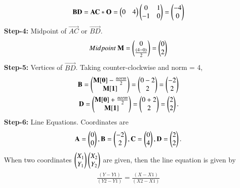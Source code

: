 \documentclass[journal,12pt,twocolumn]{IEEEtran}
\begin{document}
\begin{align}
\begin{split}
\mathbf{BD} =  \mathbf{AC * O} =  \begin{pmatrix}0&4\end{pmatrix}  \begin{pmatrix}0&1\\-1&0\end{pmatrix} = \begin{pmatrix}-4\\0\end{pmatrix}
\end{split}
\end{align}
\textbf{Step-4:} Midpoint of $\vec{AC}$ or $\vec{BD}$.
\\
\begin{align}
\begin{split}
 Midpoint\ \mathbf{M} = \begin{pmatrix}0 \\ \frac{(4-0)}{2}\end{pmatrix} = \begin{pmatrix}0\\2\end{pmatrix}
\end{split}
\end{align}
\textbf{Step-5:} Vertices of $\vec{BD}$.
Taking counter-clockwise and norm = 4,
\\
\begin{align}
\begin{split}
\mathbf{B} = \begin{pmatrix}\mathbf{M[0]}-\frac{norm}{2}\\\mathbf{M[1]}\end{pmatrix} = \begin{pmatrix}0-2\\2\end{pmatrix} = \begin{pmatrix}-2\\2\end{pmatrix}\\
\mathbf{D} = \begin{pmatrix}\mathbf{M[0]}+\frac{norm}{2}\\\mathbf{M[1]}\end{pmatrix} = \begin{pmatrix}0+2\\2\end{pmatrix} = \begin{pmatrix}2\\2\end{pmatrix}.
\end{split}
\end{align}
\textbf{Step-6:} Line Equations.
Coordinates are
\\
\begin{align}
\begin{split}
\mathbf{A} = \begin{pmatrix}0 \\ 0\end{pmatrix},
\mathbf{B} =\begin{pmatrix}-2\\2\end{pmatrix} ,
\mathbf{C} = \begin{pmatrix}0 \\ 4\end{pmatrix},
\mathbf{D} =\begin{pmatrix}2\\2\end{pmatrix}.
\end{split}
\end{align}
When two coordinates $\begin{pmatrix}X_1\\ Y_1\end{pmatrix} \begin{pmatrix}X_2 \\Y_2\end{pmatrix}$ are given, then the line equation is given by 
\begin{align}
\begin{split}
\frac{(Y-Y1)}{(Y2-Y1)} = \frac{(X-X1)}{(X2-X1)}
\end{split}
\end{align}
\end{document}
